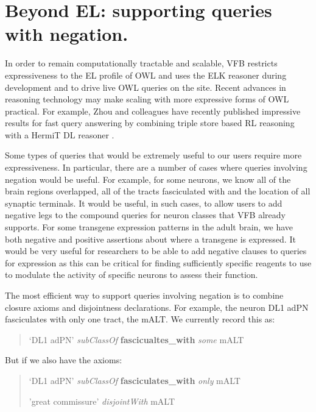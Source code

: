 \documentclass[runningheads,a4paper]{llncs}
\begin{document}
\section{Beyond EL: supporting queries with negation.}

In order to remain computationally tractable and scalable, VFB
restricts expressiveness to the EL profile of OWL and uses the ELK
reasoner \cite{kazakov2012elk} during development and to drive live
OWL queries on the site. Recent advances in reasoning
technology may make scaling with more expressive forms of OWL
practical. For example, Zhou and colleagues have recently published
impressive results for fast query answering by combining triple store
based RL reasoning with a HermiT DL reasoner \cite{ZNCH14a}.

Some types of queries that would be extremely useful to our users
require more expressiveness.  In particular, there are a number of
cases where queries involving negation would be useful.  For example,
for some neurons, we know all of the brain regions overlapped, all of
the tracts fasciculated with and the location of all synaptic
terminals.  It would be useful, in such cases, to allow users to add
negative legs to the compound queries for neuron classes that VFB
already supports.  For some transgene expression
patterns in the adult brain, we have both negative and positive
assertions about where a transgene is expressed.  It would be very
useful for researchers to be able to add negative clauses to queries for
expression as this can be critical for finding sufficiently
specific reagents to use to modulate the activity of specific neurons
to assess their function.

The most efficient way to support queries involving negation is to
combine closure axioms and disjointness declarations.  For
example, the neuron DL1 adPN fasciculates with only one tract, the
mALT.  We currently record this as:


\begin{quote}
`DL1 adPN' \textit{subClassOf} \textbf{fascicualtes\_with} \textit{some} mALT
\end{quote}

But if we also have the axioms:

\begin{quote}
`DL1 adPN' \textit{subClassOf} \textbf{fasciculates\_with} \textit{only} mALT

'great commissure' \textit{disjointWith} mALT
\end{quote}
\end{document}
